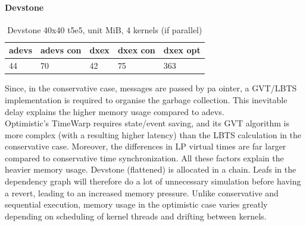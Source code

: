 \paragraph*{Devstone}
\begin{table}[htb]
	\centering
	\begin{tabular}{| l | l | l | l | l |}
		\hline
		adevs & adevs con &dxex &dxex con&dxex opt\\ \hline
		44 & 70 & 42 & 75 & 363  \\ \hline
	\end{tabular}
	\caption{Devstone 40x40 t5e5, unit MiB, 4 kernels (if parallel)}
	\label{dtone_mem}
\end{table}
Since, in the conservative case, messages are passed by pa ointer, a GVT/LBTS implementation is required to organise the garbage collection. This inevitable delay explains the higher memory usage compared to adevs.\\
Optimistic's TimeWarp requires state/event saving, and its GVT algorithm is more complex (with a resulting higher latency) than the LBTS calculation in the conservative case. 
Moreover, the differences in LP virtual times are far larger compared to conservative time synchronization. All these factors explain the heavier memory usage. Devstone (flattened) is allocated in a chain. Leafs in the dependency graph will therefore do a lot of unnecessary simulation before having a revert, leading to an increased memory pressure. Unlike conservative and sequential execution, memory usage in the optimistic case varies greatly depending on scheduling of kernel threads and drifting between kernels. 
